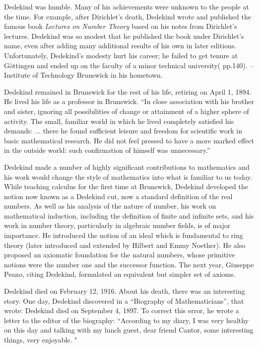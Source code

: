 \documentclass{article}
\begin{document}
Dedekind was humble. Many of his achievements were unknown to the people at the time. For example, after Dirichlet's death, Dedekind wrote and published the famous book {\em Lectures on Number Theory} based on his notes from Dirichlet's lectures. Dedekind was so modest that he published the book under Dirichlet’s name, even after adding many additional results of his own in later editions. Unfortunately, Dedekind’s modesty hurt his career; he failed to get tenure at Göttingen and ended up on the faculty of a minor technical university(\cite{StepanovRose15} pp.140). -- Institute of Technology Brunswick in his hometown.

Dedekind remained in Brunswick for the rest of his life, retiring on April 1, 1894. He lived his life as a professor in Brunswick.
``In close association with his brother and sister, ignoring all possibilities of change or attainment of a higher sphere of activity. The small, familiar world in which he lived completely satisfied his demands: ... there he found sufficient leisure and freedom for scientific work in basic mathematical research. He did not feel pressed to have a more marked effect in the outside world: such confirmation of himself was unnecessary.''

Dedekind made a number of highly significant contributions to mathematics and his work would change the style of mathematics into what is familiar to us today. While teaching calculus for the first time at Brunswick, Dedekind developed the notion now known as a Dedekind cut, now a standard definition of the real numbers. As well as his analysis of the nature of number, his work on mathematical induction, including the definition of finite and infinite sets, and his work in number theory, particularly in algebraic number fields, is of major importance. He introduced the notion of an ideal which is fundamental to ring theory (later introduced and extended by Hilbert and Emmy Noether). He also proposed an axiomatic foundation for the natural numbers, whose primitive notions were the number one and the successor function. The next year, Giuseppe Peano, citing Dedekind, formulated an equivalent but simpler set of axioms.

Dedekind died on February 12, 1916. About his death, there was an interesting story. One day, Dedekind discovered in a ``Biography of Mathematicians'', that wrote: Dedekind died on September 4, 1897. To correct this error, he wrote a letter to the editor of the biography: ``According to my diary, I was very healthy on this day and talking with my lunch guest, dear friend Cantor, some interesting things, very enjoyable. "\cite{HanXueTao16}
\end{document}

